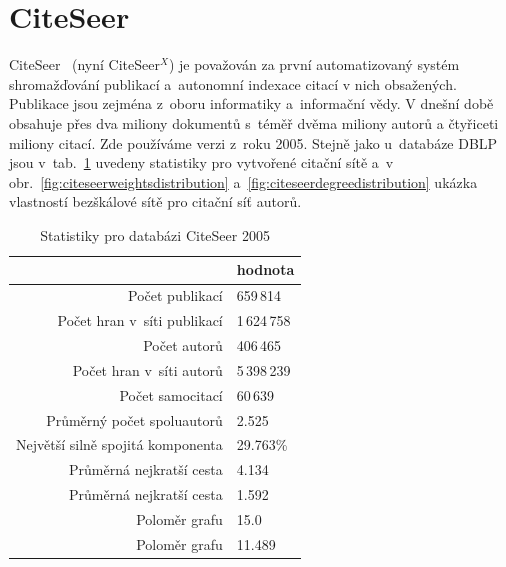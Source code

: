 \documentclass{bakalarka}
\begin{document}
\section{CiteSeer}
CiteSeer~\citep{citeseer} (nyní CiteSeer$^X$) je považován za první
automatizovaný systém shromažďování publikací a~autonomní indexace citací v
nich obsažených. Publikace jsou zejména z~oboru informatiky a~informační vědy.
V dnešní době obsahuje přes dva miliony dokumentů s~téměř dvěma miliony autorů
a čtyřiceti miliony citací. Zde používáme verzi z~roku 2005.
Stejně jako u~databáze DBLP jsou v~tab.~\ref{tab:citeseerstat} uvedeny
statistiky pro vytvořené citační sítě a~v
obr.~\ref{fig:citeseerweightsdistribution}
a~\ref{fig:citeseerdegreedistribution} ukázka vlastností bezškálové sítě pro
citační síť autorů.

\begin{table}[!ht]
\centering
\caption{Statistiky pro databázi CiteSeer 2005}
\label{tab:citeseerstat}
\begin{tabular}{r|l}
\toprule
& hodnota \\
\midrule
Počet publikací & 659\,814 \\
Počet hran v~síti publikací & 1\,624\,758 \\
Počet autorů & 406\,465 \\
Počet hran v~síti autorů & 5\,398\,239 \\
Počet samocitací & 60\,639 \\
Průměrný počet spoluautorů & 2.525 \\
Největší silně spojitá komponenta & 29.763\% \\
Průměrná nejkratší cesta\footnotemark[1] & 4.134 \\
Průměrná nejkratší cesta\footnotemark[2] & 1.592 \\
Poloměr grafu\footnotemark[1] & 15.0   \\
Poloměr grafu\footnotemark[2] & 11.489 \\
\bottomrule
\end{tabular}
\end{table}
\end{document}
